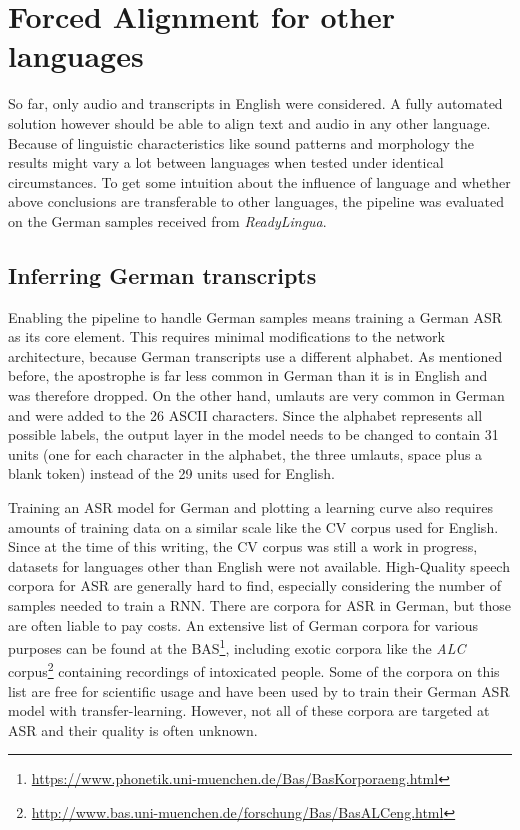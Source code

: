 \section{Forced Alignment for other languages}

So far, only audio and transcripts in English were considered. A fully automated solution however should be able to align text and audio in any other language. Because of linguistic characteristics like sound patterns and morphology the results might vary a lot between languages when tested under identical circumstances. To get some intuition about the influence of language and whether above conclusions are transferable to other languages, the pipeline was evaluated on the German samples received from \textit{ReadyLingua}.

\subsection{Inferring German transcripts}

Enabling the pipeline to handle German samples means training a German \ac{ASR} as its core element. This requires minimal modifications to the network architecture, because German transcripts use a different alphabet. As mentioned before, the apostrophe is far less common in German than it is in English and was therefore dropped. On the other hand, umlauts are very common in German and were added to the 26 ASCII characters. Since the alphabet represents all possible labels, the output layer in the model needs to be changed to contain 31 units (one for each character in the alphabet, the three umlauts, space plus a blank token) instead of the 29 units used for English.

Training an \ac{ASR} model for German and plotting a learning curve also requires amounts of training data on a similar scale like the \ac{CV} corpus used for English. Since at the time of this writing, the \ac{CV} corpus was still a work in progress, datasets for languages other than English were not available. High-Quality speech corpora for \ac{ASR} are generally hard to find, especially considering the number of samples needed to train a \ac{RNN}. There are corpora for \ac{ASR} in German, but those are often liable to pay costs. An extensive list of German corpora for various purposes can be found at the \ac{BAS}\footnote{\url{https://www.phonetik.uni-muenchen.de/Bas/BasKorporaeng.html}}, including exotic corpora like the \textit{ALC} corpus\footnote{\url{http://www.bas.uni-muenchen.de/forschung/Bas/BasALCeng.html}} containing recordings of intoxicated people. Some of the corpora on this list are free for scientific usage and have been used by \cite{budget} to train their German \ac{ASR} model with transfer-learning. However, not all of these corpora are targeted at \ac{ASR} and their quality is often unknown.

